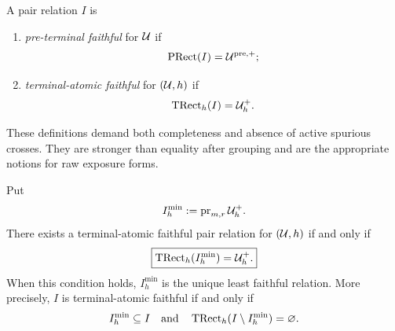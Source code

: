 \begin{definition}
\label{def:completion-atomic-faithful}
A pair relation \(I\) is
\begin{enumerate}[label=\textup{(\alph*)},leftmargin=2.7em]
 \item \emph{pre-terminal faithful} for \(\mathcal U\) if
       \begin{equation}
        \operatorname{PRect}(I)=\mathcal U^{\mathrm{pre},+};
        \label{eq:completion-pre-faithful}
       \end{equation}
 \item \emph{terminal-atomic faithful} for \((\mathcal U,h)\) if
       \begin{equation}
        \operatorname{TRect}_h(I)=\mathcal U_h^+.
        \label{eq:completion-terminal-faithful}
       \end{equation}
\end{enumerate}
\end{definition}

These definitions demand both completeness and absence of active spurious
crosses.  They are stronger than equality after grouping and are the
appropriate notions for raw exposure forms.

\begin{theorem}
\label{thm:completion-least-terminal-faithful-relation}
Put
\begin{equation}
 I_h^{\min}:=\operatorname{pr}_{m,r}\mathcal U_h^+.
 \label{eq:completion-Ih-min}
\end{equation}
There exists a terminal-atomic faithful pair relation for \((\mathcal U,h)\) if
and only if
\begin{equation}
 \boxed{\operatorname{TRect}_h(I_h^{\min})=\mathcal U_h^+.}
 \label{eq:completion-terminal-rectangularity-criterion}
\end{equation}
When this condition holds, \(I_h^{\min}\) is the unique least faithful
relation.  More precisely, \(I\) is terminal-atomic faithful if and only if
\begin{equation}
 I_h^{\min}\subseteq I
 \quad\text{and}\quad
 \operatorname{TRect}_h(I\setminus I_h^{\min})=\varnothing.
 \label{eq:completion-all-terminal-faithful-relations}
\end{equation}
\end{theorem}


